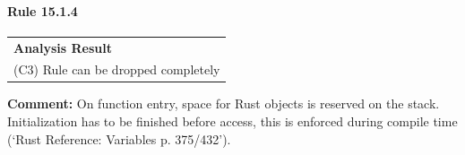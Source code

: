 \paragraph{Rule 15.1.4}
\begin{longtable}{p{13cm}}
\textbf{Analysis Result} \\
(C3) Rule can be dropped completely \\
\end{longtable}
\textbf{Comment:} On function entry, space for Rust objects is reserved on the stack. Initialization has to be finished before access, this is enforced during compile time (`Rust Reference: Variables p. 375/432'). \\
